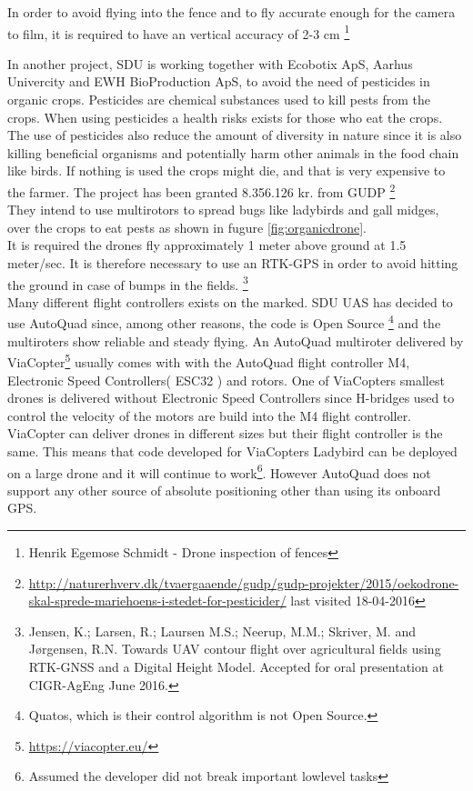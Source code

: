 In order to avoid flying into the fence and to fly accurate enough for the camera to film, it is required to have an vertical accuracy of 2-3 cm \footnote{Henrik Egemose Schmidt - Drone inspection of fences}

In another project, SDU is working together with Ecobotix ApS, Aarhus Univercity and EWH BioProduction ApS, to avoid the need of pesticides in organic crops. Pesticides are  chemical substances used to kill pests from the crops. When using pesticides a health risks exists for those who eat the crops. The use of pesticides also reduce the amount of diversity in nature since it is also killing beneficial organisms and potentially harm other animals in the food chain like birds. If nothing is used the crops might die, and that is very expensive to the farmer. The project has been granted 8.356.126 kr. from GUDP \footnote{\url{http://naturerhverv.dk/tvaergaaende/gudp/gudp-projekter/2015/oekodrone-skal-sprede-mariehoens-i-stedet-for-pesticider/} last visited 18-04-2016}\\
They intend to use multirotors to spread bugs like ladybirds and gall midges, over the crops to eat pests as shown in fugure \ref{fig:organicdrone}. \\
It is required the drones fly approximately 1 meter above ground at 1.5 meter/sec. It is therefore necessary to use an RTK-GPS in order to avoid hitting the ground in case of bumps in the fields. \footnote{Jensen, K.; Larsen, R.; Laursen M.S.; Neerup, M.M.; Skriver, M. and Jørgensen, R.N. Towards UAV contour flight over agricultural fields using RTK-GNSS and a Digital Height Model. Accepted for oral presentation at CIGR-AgEng June 2016.}\\


Many different flight controllers exists on the marked. SDU UAS has decided to use AutoQuad since, among other reasons, the code is Open Source \footnote{Quatos, which is their control algorithm is not Open Source.} and the multiroters show reliable and steady flying. An AutoQuad multiroter delivered by ViaCopter\footnote{\url{https://viacopter.eu/}} usually comes with with the AutoQuad flight controller M4, Electronic Speed Controllers( ESC32 ) and rotors. One of ViaCopters smallest drones is delivered without Electronic Speed Controllers since H-bridges used to control the velocity of the motors are build into the M4 flight controller.
ViaCopter can deliver drones in different sizes but their flight controller is the same. This means that code developed for ViaCopters Ladybird can be deployed on a large drone and it will continue to work\footnote{Assumed the developer did not break important lowlevel tasks}. However AutoQuad does not support any other source of absolute positioning other than using its onboard GPS. \\

